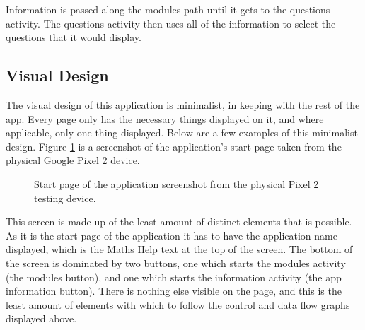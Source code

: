 \documentclass{article}
\begin{document}
Information is passed along the modules path until it gets to the questions activity. The questions activity then uses all of the information to select the questions that it would display. \par

\subsection{Visual Design}

The visual design of this application is minimalist, in keeping with the rest of the app. Every page only has the necessary things displayed on it, and where applicable, only one thing displayed. Below are a few examples of this minimalist design. Figure \ref{figure:applicationStartPage} is a screenshot of the application's start page taken from the physical Google Pixel 2 device.

\begin{figure}[H]
	\centering
	\caption{Start page of the application screenshot from the physical Pixel 2 testing device.}
	\label{figure:applicationStartPage}
\end{figure}

This screen is made up of the least amount of distinct elements that is possible. As it is the start page of the application it has to have the application name displayed, which is the Maths Help text at the top of the screen. The bottom of the screen is dominated by two buttons, one which starts the modules activity (the modules button), and one which starts the information activity (the app information button). There is nothing else visible on the page, and this is the least amount of elements with which to follow the control and data flow graphs displayed above. \par
\end{document}
